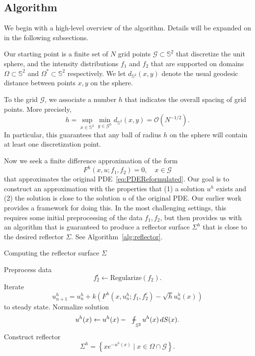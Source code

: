 \documentclass{amsart}
\newcommand{\bq}{\begin{equation}}
\newcommand{\eq}{\end{equation}}
\newcommand{\G}{\mathcal{G}}
\newcommand{\bO}{\mathcal{O}}
\newcommand{\Sf}{\mathbb{S}^{2}}
\newcommand*{\avint}{\mathop{\ooalign{$\int$\cr$-$}}}
\theoremstyle{lemma}
\theoremstyle{remark}
\begin{document}
\subsection{Algorithm}
We begin with a high-level overview of the algorithm.  Details will be expanded on in the following subsections.

Our starting point is a finite set of $N$ grid points $\G \subset \Sf$ that discretize the unit sphere, and the intensity distributions $f_1$ and $f_2$ that are supported on domains $\Omega\subset\Sf$ and $\Omega^*\subset\Sf$ respectively.  We let $d_{\Sf}(x,y)$ denote the usual geodesic distance between points $x,y$ on the sphere.

To the grid $\G$, we associate a number $h$ that indicates the overall spacing of grid points.  More precisely,
\begin{equation}\label{eq:h}
h = \sup\limits_{x\in\Sf}\min\limits_{y\in\G^h} d_{\Sf}(x,y) = \bO\left(N^{-1/2}\right).
\end{equation}
In particular, this guarantees that any ball of radius $h$ on the sphere will contain at least one discretization point.

Now we seek a finite difference approximation of the form
\bq\label{eq:fd}
F^h(x,u;f_1,f_2) = 0, \quad x \in \G
\eq
that approximates the original PDE~\eqref{eq:PDEReformulated}.  Our goal is to construct an approximation with the properties that (1) a solution $u^h$ exists and (2) the solution is close to the solution $u$ of the original PDE.  Our earlier work~\cite{HT_OTonSphere,HT_OTonSphere2} provides a framework for doing this.  In the most challenging settings, this requires some initial preprocessing of the data $f_1, f_2$, but then provides us with an algorithm that is guaranteed to produce a reflector surface $\Sigma^h$ that is close to the desired reflector $\Sigma$.
See Algorithm~\ref{alg:reflector}.

\begin{algorithm}[h]
\caption{Computing the reflector surface $\Sigma$}
\label{alg:reflector}
\begin{algorithmic}[1]
\State Preprocess data \[f_2^\epsilon \leftarrow \text{Regularize}(f_2).\]
\State Iterate
\[ u^h_{n+1} = u^h_n + k \left(F^h(x,u^h_n;f_1,{f_2^\epsilon}) - \sqrt{h}u^h_n(x) \right) \]
to steady state.
\State Normalize solution
\[ u^h(x) \leftarrow u^h(x) - \avint_{\phantom{==}\Sf}u^h(x)\,dS(x). \]
\State Construct reflector
\[ \Sigma^h = \left\{xe^{-u^h(x)} \mid x \in \Omega \cap \G\right\}. \]
\end{algorithmic}
\end{algorithm}
\end{document}

